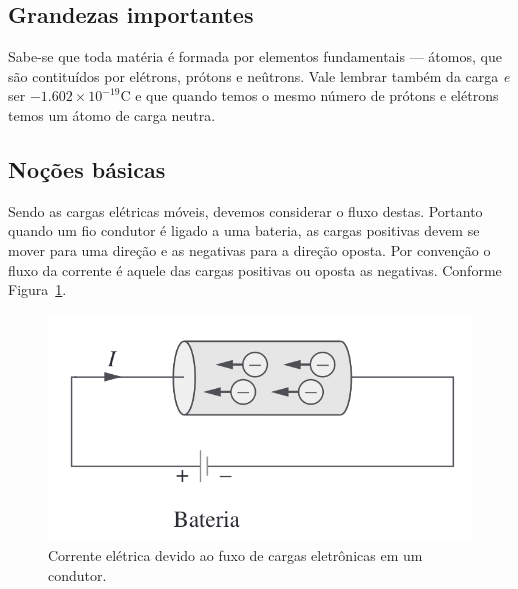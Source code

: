 \subsection{\textbf{Grandezas importantes}}

Sabe-se que toda matéria é formada por elementos fundamentais --- átomos,
que são contituídos por elétrons, prótons e neûtrons. Vale lembrar também da
carga \textit{e} ser \( -1.602 \times 10^{-19} \)C e que quando temos o mesmo
número de prótons e elétrons temos um átomo de carga neutra.

\subsection{\textbf{Noções básicas}}

Sendo as cargas elétricas móveis, devemos considerar o fluxo destas. Portanto
quando um fio condutor é ligado a uma bateria, as cargas positivas devem se
mover para uma direção e as negativas para a direção oposta. Por convenção o
fluxo da corrente é aquele das cargas positivas ou oposta as negativas. Conforme
Figura~\ref{fig:fig1}.

\begin{figure}[H]
	\centering
	\setlength{\fboxsep}{0pt}
	\includegraphics[height=0.1\textwidth]{./fig/fig1.png}
	\caption{Corrente elétrica devido ao fuxo de cargas eletrônicas em um condutor.}
	\label{fig:fig1}
\end{figure}
